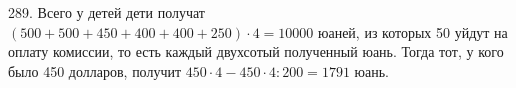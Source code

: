 289. Всего у детей дети получат $(500+500+450+400+400+250)\cdot4=10000$ юаней, из которых 50 уйдут на оплату комиссии, то есть каждый двухсотый полученный юань. Тогда тот, у кого было 450 долларов, получит $450\cdot4-450\cdot4:200=1791$ юань.\\
